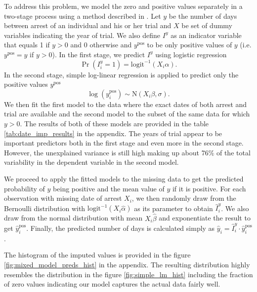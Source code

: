 To address this problem, we model the zero and positive values separately in a two-stage process 
using a method described in \citet[p. 537-538]{gelman_data_2006}. 
Let $y$ be the number of days between arrest of an individual and his or her trial and $X$ be set of dummy variables indicating the year of trial. We also define $I^y$ as an indicator variable that equals 1 if $y > 0$ and 0 otherwise and  $y^{\text{pos}}$ to be only positive values of $y$ (i.e. $y^{\text{pos}} = y$ if   $y > 0$).  In the first stage, we predict $I^y$  using logistic regression
\begin{equation}
\Pr\left( I_i^y = 1 \right)  = \text{logit}^{-1} \left(X_i \alpha \right).
\end{equation}
In the second stage, simple log-linear regression is applied to predict only the positive values $y^{\text{pos}}$
\begin{equation}
\log\left(y_i^{\text{pos}}\right) \sim \text{N} \left(X_i \beta, \sigma \right).
\end{equation}
We then fit the first model to the data where the exact dates of both arrest and trial are available and the second model to the subset of the same  data for which $y > 0$.
The results of both of these models are provided in the table \ref{tab:date_imp_results} in the appendix. The years of trial appear to be important predictors both in the first stage and even more in the second stage. 
However, the unexplained variance is still high making up about 76\% of the total variability in the dependent variable in the second model. 

We  proceed to apply the fitted models to the missing data to get the predicted probability of $y$  being positive and the mean value of $y$ if it is positive. For each observation with missing date of arrest $X_i$, we then randomly draw from the Bernoulli distribution with  $\text{logit}^{-1} \left(X_i \hat\alpha \right)$ as its parameter to obtain $\hat I_i^y$. We also draw from the normal distribution with mean $X_i \hat\beta$ and exponentiate the result to get $\hat y_i^{\text{pos}}$. Finally, the predicted number of days is calculated simply as $\hat y_i = \hat I_i^y \cdot \hat y_i^{\text{pos}}$. 

The histogram of the imputed values is provided in the figure \ref{fig:mixed_model_preds_hist} in the appendix. 
The resulting distribution  highly resembles the distribution  in the figure \ref{fig:simple_lm_hist} including the fraction of zero values indicating our model captures the actual data fairly well. 

